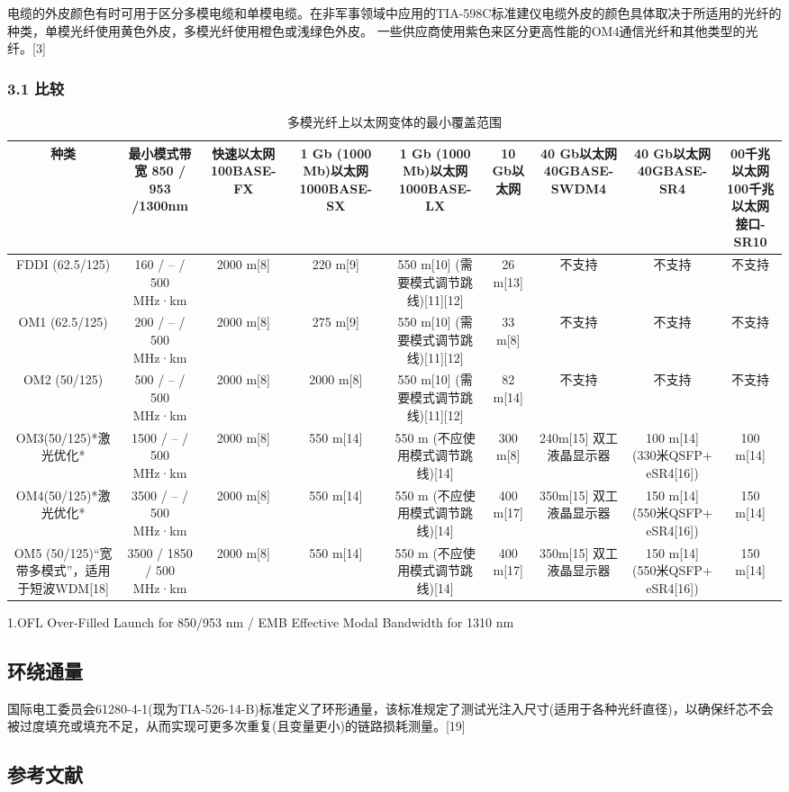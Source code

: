 电缆的外皮颜色有时可用于区分多模电缆和单模电缆。在非军事领域中应用的TIA-598C标准建仪电缆外皮的颜色具体取决于所适用的光纤的种类，单模光纤使用黄色外皮，多模光纤使用橙色或浅绿色外皮。 一些供应商使用紫色来区分更高性能的OM4通信光纤和其他类型的光纤。[3]

\subsubsection{3.1 比较 }
\begin{table}[ht]
\centering
\caption{多模光纤上以太网变体的最小覆盖范围}\label{tab_DMGQ1}
\begin{tabular}{|c|c|c|c|c|c|c|c|c|}
\hline
种类 & 最小模式带宽 
850 / 953 /1300nm& 快速以太网100BASE-FX & 1 Gb (1000 Mb)以太网1000BASE-SX & 1 Gb (1000 Mb)以太网1000BASE-LX & 10 Gb以太网 & 40 Gb以太网
40GBASE-SWDM4& 40 Gb以太网40GBASE-SR4 &00千兆以太网100千兆以太网接口-SR10 \\
\hline
FDDI (62.5/125) &160 / – / 500 MHz·km& 2000 m[8] &220 m[9] & 550 m[10] (需要模式调节跳线)[11][12]& 26 m[13] & 不支持& 不支持 & 不支持 \\
\hline
OM1 (62.5/125) & 200 / – / 500 MHz·km &2000 m[8]& 275 m[9] & 550 m[10] (需要模式调节跳线)[11][12] & 33 m[8]& 不支持 & 不支持 & 不支持 \\
\hline
OM2 (50/125)& 500 / – / 500 MHz·km &2000 m[8]& 2000 m[8] & 550 m[10] (需要模式调节跳线)[11][12]& 82 m[14]&不支持 &不支持& 不支持\\
\hline
OM3(50/125)*激光优化* & 1500 / – / 500 MHz·km & 2000 m[8] & 550 m[14] &550 m (不应使用模式调节跳线)[14]& 300 m[8]& 240m[15]
双工液晶显示器& 100 m[14]
(330米QSFP+ eSR4[16]) & 100 m[14]\\
\hline
OM4(50/125)*激光优化* &3500 / – / 500 MHz·km& 2000 m[8] & 550 m[14]&550 m (不应使用模式调节跳线)[14] & 400 m[17]&350m[15]
双工液晶显示器& 150 m[14]
(550米QSFP+ eSR4[16])&150 m[14]\\
\hline
OM5 (50/125)“宽带多模式”，适用于短波WDM[18] & 3500 / 1850 / 500  MHz·km & 2000 m[8] & 550 m[14]&550 m (不应使用模式调节跳线)[14] & 400 m[17]&350m[15]
双工液晶显示器& 150 m[14]
(550米QSFP+ eSR4[16])&150 m[14]\\
\hline
\end{tabular}
\end{table}
1.OFL Over-Filled Launch for 850/953 nm / EMB Effective Modal Bandwidth for 1310 nm
\subsection{环绕通量}
国际电工委员会61280-4-1(现为TIA-526-14-B)标准定义了环形通量，该标准规定了测试光注入尺寸(适用于各种光纤直径)，以确保纤芯不会被过度填充或填充不足，从而实现可更多次重复(且变量更小)的链路损耗测量。[19]

\subsection{参考文献}
